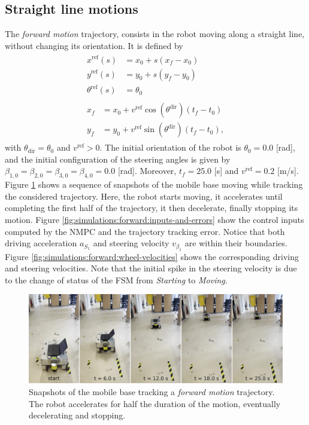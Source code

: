 \subsection{Straight line motions}
The \textit{forward motion} trajectory, consists in the robot moving along a
straight line, without changing its orientation. It is defined by
\begin{equation*}
\renewcommand{\arraystretch}{1.3}
\begin{array}{c}
    \begin{aligned}
        x^{\mathrm{ref}}(s) &= x_0 + s (x_f - x_0) \\
        y^{\mathrm{ref}}(s) &= y_0 + s (y_f - y_0) \\
        \theta^{\mathrm{ref}}(s) &= \theta_0
    \end{aligned}  \\
    \begin{aligned}
        x_f &= x_0 + v^{\mathrm{ref}} \cos(\theta^{\mathrm{dir}}) (t_f - t_0) \\
        y_f &= y_0 + v^{\mathrm{ref}} \sin(\theta^{\mathrm{dir}}) (t_f - t_0),
     \end{aligned}
\end{array}
\end{equation*}
with $\theta_{\mathrm{dir}}=\theta_0$ and $v^{\mathrm{ref}}>0$.
The initial orientation of the robot is $\theta_0=0.0$ [rad], and the
initial configuration of the steering angles is given by
$\beta_{1,0}=\beta_{2,0}=\beta_{3,0}=\beta_{4,0}=0.0$ [rad].
Moreover, $t_f = 25.0$ [s] and $v^{\mathrm{ref}}=0.2$ [m/s].
Figure \ref{fig:experiments:forward:snapshots} shows a sequence of snapshots
of the mobile base moving while tracking the considered trajectory. Here, the 
robot starts moving, it accelerates until completing the first half of the
trajectory, it then decelerate, finally stopping its motion.
Figure \ref{fig:simulations:forward:inputs-and-errors} show the control inputs 
computed by the NMPC and the trajectory tracking error. Notice that both 
driving acceleration $a_{S_1}$ and steering velocity $v_{\beta_1}$ are within 
their boundaries.
Figure \ref{fig:simulations:forward:wheel-velocities} shows the corresponding
driving and steering velocities. Note that the initial spike in the 
steering velocity is due to the change of status of the FSM from \textit{Starting}
to \textit{Moving}.
\begin{figure}
    \centering
    \includegraphics[width=\textwidth]{figures/SWMR/simulations/forward/snapshots.jpeg}
    \caption{Snapshots of the mobile base tracking a \textit{forward motion} trajectory.
        The robot accelerates for half the duration of the motion, eventually
        decelerating and stopping.}
    \label{fig:experiments:forward:snapshots}
\end{figure}

